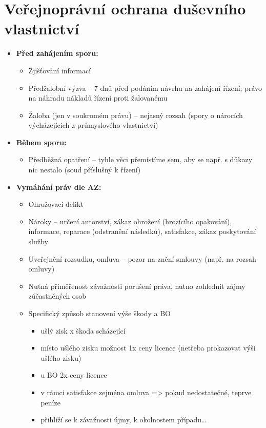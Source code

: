 
\section{Veřejnoprávní ochrana duševního vlastnictví}

\begin{itemize}
    \item\textbf{Před zahájením sporu:} 
    \begin{itemize}
        \item Zjišťování informací
        \item Předžalobní výzva – 7 dnů před podáním návrhu na zahájení řízení; právo na náhradu nákladů řízení proti
        žalovanému
        \item Žaloba (jen v soukromém právu) – nejasný rozsah (spory o nárocích výcházejících z průmyslového vlastnictví)
    \end{itemize}
    \item\textbf{Během sporu:}
    \begin{itemize}
        \item Předběžná opatření – tyhle věci přemístíme sem, aby se např. s důkazy nic nestalo (soud příslušný k řízení)
    \end{itemize}
    \item\textbf{Vymáhání práv dle AZ:}
    \begin{itemize}
        \item Ohrožovací delikt
        \item Nároky – určení autorství, zákaz ohrožení (hrozícího opakování), informace, reparace (odstranění následků),
        satisfakce, zákaz poskytování služby
        \item Uveřejnění rozsudku, omluva – pozor na znění smlouvy (např. na rozsah omluvy)
        \item Nutná přiměřenost závažnosti porušení práva, nutno zohlednit zájmy zúčastněných osob
        \item Specifický způsob stanovení výše škody a BO
        \begin{itemize}
            \item ušlý zisk x škoda scházející
            \item místo ušlého zisku možnost 1x ceny licence (netřeba prokazovat výši ušlého zisku)
            \item u BO 2x ceny licence
            \item v rámci satisfakce zejména omluva => pokud nedostatečné, teprve peníze
            \item přihlíží se k závažnosti újmy, k okolnostem případu…

\end{itemize}
\end{itemize}
\end{itemize}
